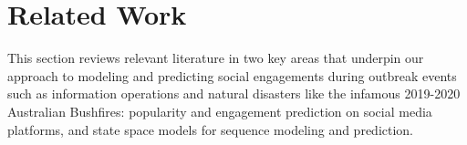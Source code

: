 \section{Related Work}
This section reviews relevant literature in two key areas that underpin our approach to modeling and predicting social engagements during outbreak events such as information operations and natural disasters like the infamous 2019-2020 Australian Bushfires:
popularity and engagement prediction on social media platforms, and
state space models for sequence modeling and prediction.


%
%




